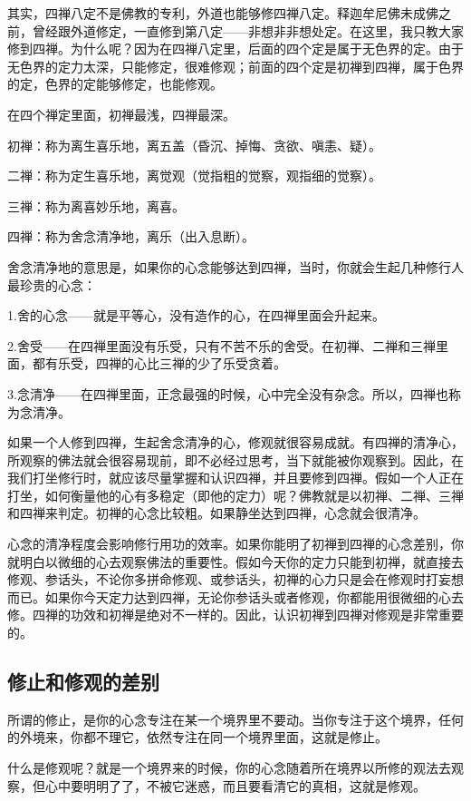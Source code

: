 \documentclass{book}
\begin{document}
其实，四禅八定不是佛教的专利，外道也能够修四禅八定。释迦牟尼佛未成佛之前，曾经跟外道修定，一直修到第八定——非想非非想处定。在这里，我只教大家修到四禅。为什么呢？因为在四禅八定里，后面的四个定是属于无色界的定。由于无色界的定力太深，只能修定，很难修观；前面的四个定是初禅到四禅，属于色界的定，色界的定能够修定，也能修观。

在四个禅定里面，初禅最浅，四禅最深。

初禅：称为离生喜乐地，离五盖（昏沉、掉悔、贪欲、嗔恚、疑）。

二禅：称为定生喜乐地，离觉观（觉指粗的觉察，观指细的觉察）。

三禅：称为离喜妙乐地，离喜。

四禅：称为舍念清净地，离乐（出入息断）。

舍念清净地的意思是，如果你的心念能够达到四禅，当时，你就会生起几种修行人最珍贵的心念：

1.舍的心念——就是平等心，没有造作的心，在四禅里面会升起来。

2.舍受——在四禅里面没有乐受，只有不苦不乐的舍受。在初禅、二禅和三禅里面，都有乐受，四禅的心比三禅的少了乐受贪着。

3.念清净——在四禅里面，正念最强的时候，心中完全没有杂念。所以，四禅也称为念清净。

如果一个人修到四禅，生起舍念清净的心，修观就很容易成就。有四禅的清净心，所观察的佛法就会很容易现前，即不必经过思考，当下就能被你观察到。因此，在我们打坐修行时，就应该尽量掌握和认识四禅，并且要修到四禅。假如一个人正在打坐，如何衡量他的心有多稳定（即他的定力）呢？佛教就是以初禅、二禅、三禅和四禅来判定。初禅的心念比较粗。如果静坐达到四禅，心念就会很清净。

心念的清净程度会影响修行用功的效率。如果你能明了初禅到四禅的心念差别，你就明白以微细的心去观察佛法的重要性。假如今天你的定力只能到初禅，就直接去修观、参话头，不论你多拼命修观、或参话头，初禅的心力只是会在修观时打妄想而已。如果你今天定力达到四禅，无论你参话头或者修观，你都能用很微细的心去修。四禅的功效和初禅是绝对不一样的。因此，认识初禅到四禅对修观是非常重要的。

\subsection{修止和修观的差别}

所谓的修止，是你的心念专注在某一个境界里不要动。当你专注于这个境界，任何的外境来，你都不理它，依然专注在同一个境界里面，这就是修止。

什么是修观呢？就是一个境界来的时候，你的心念随着所在境界以所修的观法去观察，但心中要明明了了，不被它迷惑，而且要看清它的真相，这就是修观。
\end{document}
